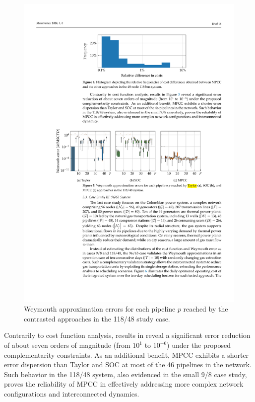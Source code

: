 \begin{figure}[h]
\centering    
    \includegraphics[scale=1]{figures/Chapter_MPCC/g004.pdf}
\caption{Weymouth approximation errors for each pipeline $p$ reached by the contrasted approaches in the 118/48 study case.} 
\label{fig:green_test_error}
\end{figure}


Contrarily to cost function analysis, results in  reveal a significant error reduction of about seven orders of magnitude (from $10^1$ to $10^{-6}$) under the proposed complementarity constraints. As an additional benefit, MPCC exhibits a shorter error dispersion than Taylor and SOC at most of the 46 pipelines in the network. Such behavior in the 118/48 system, also evidenced in the small 9/8 case study, proves the reliability of MPCC in effectively addressing more complex network configurations and interconnected dynamics.


